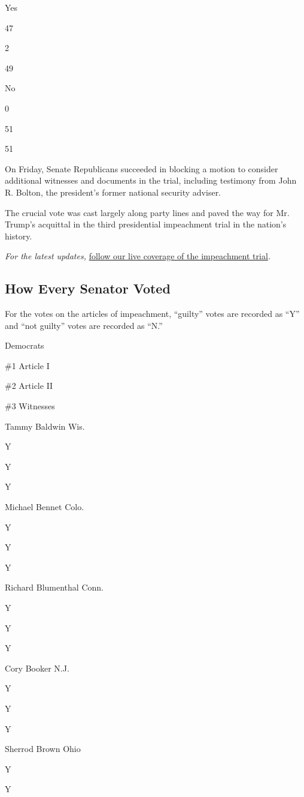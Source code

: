 Yes

47

2

49

No

0

51

51

On Friday, Senate Republicans succeeded in blocking a motion to consider
additional witnesses and documents in the trial, including testimony
from John R. Bolton, the president's former national security adviser.

The crucial vote was cast largely along party lines and paved the way
for Mr. Trump's acquittal in the third presidential impeachment trial in
the nation's history.

\emph{For the latest updates,}
\href{https://www.nytimes3xbfgragh.onion/2020/02/05/us/politics/impeachment-vote.html}{follow
our live coverage of the impeachment trial}\emph{.}

\hypertarget{how-every-senator-voted}{%
\subsection{How Every Senator Voted}\label{how-every-senator-voted}}

For the votes on the articles of impeachment, ``guilty'' votes are
recorded as ``Y'' and ``not guilty'' votes are recorded as ``N.''

Democrats

 \#1 Article I

 \#2 Article II

 \#3 Witnesses

Tammy Baldwin Wis.

Y

Y

Y

Michael Bennet Colo.

Y

Y

Y

Richard Blumenthal Conn.

Y

Y

Y

Cory Booker N.J.

Y

Y

Y

Sherrod Brown Ohio

Y

Y

